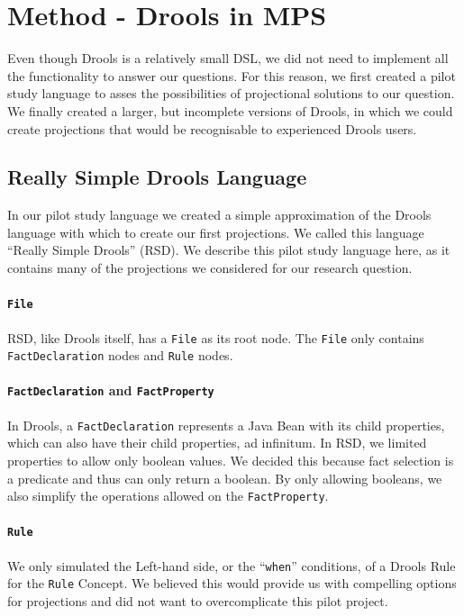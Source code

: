 \section{Method - Drools in MPS}
\label{section:dsr_method}

Even though Drools is a relatively small DSL, we did not need to implement all the functionality to answer our questions.
For this reason, we first created a pilot study language to asses the possibilities of projectional solutions to our question.
We finally created a larger, but incomplete versions of Drools, in which we could create projections that would be recognisable to experienced Drools users.

\subsection{Really Simple Drools Language}
In our pilot study language we created a simple approximation of the Drools language with which to create our first projections.
We called this language ``Really Simple Drools'' (RSD).
We describe this pilot study language here, as it contains many of the projections we considered for our research question.

\paragraph{\texttt{File}} RSD, like Drools itself, has a \texttt{File} as its root node.
The \texttt{File} only contains \texttt{FactDeclaration} nodes and \texttt{Rule} nodes.

\paragraph{\texttt{FactDeclaration} and \texttt{FactProperty}} In Drools, a \texttt{FactDeclaration} represents a Java Bean with its child properties, which can also have their child properties, ad infinitum.
In RSD, we limited properties to allow only boolean values.
We decided this because fact selection is a predicate and thus can only return a boolean.
By only allowing booleans, we also simplify the operations allowed on the \texttt{FactProperty}.

\paragraph{\texttt{Rule}} We only simulated the Left-hand side, or the ``\texttt{when}'' conditions, of a Drools Rule for the \texttt{Rule} Concept.
We believed this would provide us with compelling options for projections and did not want to overcomplicate this pilot project.


